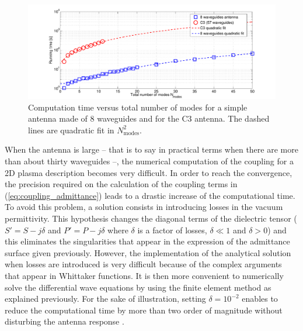 %
\begin{figure}[h]
	\begin{centering}
		\includegraphics[width=1.0\textwidth]{figures/chap2/ALOHA/figure5}
		\par\end{centering}
	
	\caption{Computation time versus total number of modes for a simple antenna
		made of 8 waveguides and for the C3 antenna. The dashed lines are
		quadratic fit in $N_{\mbox{modes}}^{2}$. \label{fig:Computation-time-versus-modes}}
	
\end{figure}


When the antenna is large -- that is to say in practical terms when there are more than about thirty waveguides --, the numerical computation of the coupling for a 2D plasma description becomes very difficult. In order to reach the convergence, the precision required on the calculation of the coupling terms in (\ref{eq:coupling_admittance}) leads to a drastic increase of the computational time. To avoid this problem, a solution consists in introducing losses in the vacuum permittivity. This hypothesis changes the diagonal terms of the dielectric tensor ($S'=S-j\delta$ and $P'=P-j\delta$ where $\delta$ is a factor of losses, $\delta\ll1$ and $\delta>0$) and this eliminates the singularities that appear in the expression of the admittance surface given previously. However, the implementation of the analytical solution when losses are introduced is very difficult because of the complex arguments that appear in Whittaker functions. It is then more convenient to numerically solve the differential wave equations by using the finite element method as explained previously. For the sake of illustration, setting $\delta=10^{-2}$ enables to reduce the computational time by more than two order of magnitude without disturbing the antenna response .


